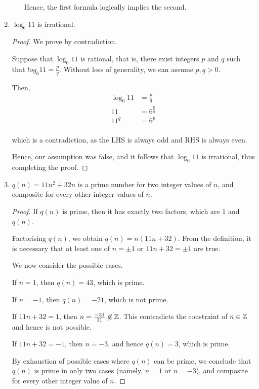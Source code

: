 \begin{enumerate}
\begin{enumerate}
        Hence, the first formula logically implies the second.

    \end{enumerate}

\item
    \begin{theorem}
        $\log_6 11$ is irrational.
    \end{theorem}
    \begin{proof}
        We prove by contradiction.

        Suppose that $\log_6 11$ is rational, that is, there exist
        integers $p$ and $q$ such that $log_6 11 = \frac{p}{q}$.
        Without loss of generality, we can assume $p, q > 0$.

        Then,
        \begin{align*}
            \log_6 11 &= \frac{p}{q} \\
            11 &= 6^\frac{p}{q} \\
            11^q &= 6^p \\
        \end{align*}

        which is a contradiction, as the LHS is always odd and RHS is
        always even.

        Hence, our assumption was false, and it follows that $\log_6 11$
        is irrational, thus completing the proof.
    \end{proof}

\item
    \begin{theorem}
        $q(n) = 11n^2 + 32n$ is a prime number for two integer values
        of $n$, and composite for every other integer values of $n$.
    \end{theorem}
    \begin{proof}
        If $q(n)$ is prime, then it has exactly two factors, which are
        1 and $q(n)$.

        Factorising $q(n)$, we obtain $q(n) = n(11n+32)$.
        From the definition, it is necessary that at least one of
        $n = \pm 1$ or $11n + 32 = \pm 1$ are true.

        We now consider the possible cases.

        If $n = 1$,  then $q(n) = 43$, which is prime.

        If $n = -1$, then $q(n) = -21$, which is not prime.

        If $11n + 32 = 1$, then $n = \frac{-31}{11} \not \in \mathbb{Z}$.
        This contradicts the constraint of $n \in \mathbb{Z}$ and hence is not
        possible.

        If $11n + 32 = -1$, then $n = -3$, and hence $q(n) = 3$,
        which is prime.

        By exhaustion of possible cases where $q(n)$ can be prime, we
        conclude that $q(n)$ is prime in only two cases (namely, $n=1$
        or $n=-3$), and composite for every other integer value of $n$.
    \end{proof}
\end{enumerate}
